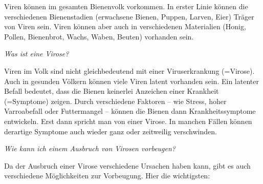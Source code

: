 Viren können im gesamten Bienenvolk vorkommen. In erster Linie können die verschiedenen Bienenstadien (erwachsene Bienen, Puppen, Larven, Eier) Träger von Viren sein. Viren können aber auch in verschiedenen Materialien (Honig, Pollen, Bienenbrot, Wachs, Waben, Beuten) vorhanden sein.

\textit{Was ist eine Virose?}

Viren im Volk sind nicht gleichbedeutend mit einer Viruserkrankung (=Virose). Auch in gesunden Völkern können viele Viren latent vorhanden sein. Ein latenter Befall bedeutet, dass die Bienen keinerlei Anzeichen einer Krankheit (=Symptome) zeigen. Durch verschiedene Faktoren – wie Stress, hoher Varroabefall oder Futtermangel – können die Bienen dann Krankheitssymptome entwickeln. Erst dann spricht man von einer Virose. In manchen Fällen können derartige Symptome auch wieder ganz oder zeitweilig verschwinden.

\textit{Wie kann ich einem Ausbruch von Virosen vorbeugen?}

Da der Ausbruch einer Virose verschiedene Ursachen haben kann, gibt es auch verschiedene Möglichkeiten zur Vorbeugung. Hier die wichtigsten:

